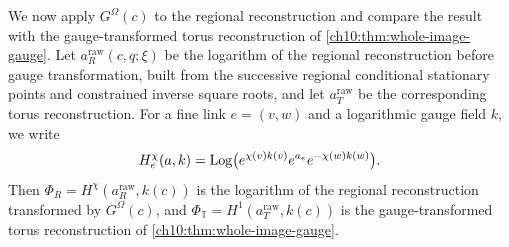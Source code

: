 We now apply $G^\Omega(c)$ to the regional reconstruction and compare the result with the gauge-transformed torus reconstruction of \cref{ch10:thm:whole-image-gauge}. Let $a^{\mathrm{raw}}_R(c,q;\xi)$ be the logarithm of the regional reconstruction before gauge transformation, built from the successive regional conditional stationary points and constrained inverse square roots, and let $a^{\mathrm{raw}}_T$ be the corresponding torus reconstruction. For a fine link $e=(v,w)$ and a logarithmic gauge field $k$, we write
\[
 H_e^\chi(a,k)=\operatorname{Log}\bigl(e^{\chi(v)k(v)}e^{a_e}
                                      e^{-\chi(w)k(w)}\bigr).
\]
Then $\Phi_R=H^\chi(a^{\mathrm{raw}}_R,k(c))$ is the logarithm of the regional reconstruction transformed by $G^\Omega(c)$, and $\Phi_{\mathbb T}=H^1(a^{\mathrm{raw}}_T,k(c))$ is the gauge-transformed torus reconstruction of \cref{ch10:thm:whole-image-gauge}.

